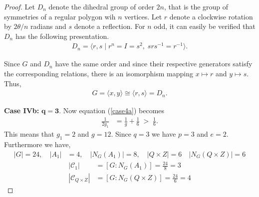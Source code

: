 \begin{proof}
Let $D_n$ denote the dihedral group of order $2n$, that is the group of symmetries of a regular polygon wih $n$ vertices. Let $r$ denote a clockwise rotation by $2\theta /n$ radians and $s$ denote a reflection. For $n$ odd, it can easily be verified that $D_n$ has the following presentation.
\begin{align*} D_n = \langle r, s \; | \; r^n = I = s^2, \; s r s^{-1} = r^{-1} \rangle.
\end{align*}

Since $G$ and $D_n$ have the same order and since their respective generators satisfy the corresponding relations, there is an isomorphism mapping $x \mapsto r$ and $y \mapsto s$. Thus,
\begin{align*} G = \langle x, y \rangle \cong \langle r, s \rangle = D_n.
\end{align*}

 \space \textbf{Case IVb:} $\pmb{q = 3}$. Now equation (\ref{case4a}) becomes
\begin{align*} \frac{1}{2g_1} &= \frac{1}{g} + \frac{1}{6} \; > \; \frac{1}{6}.
\end{align*}
This means that $g_1 = 2$ and $g = 12$. Since $q=3$ we have $p=3$ and $e=2$. Furthermore we have,
\begin{align*} |G| = 24, \quad |A_1| &= 4,  \quad |N_G(A_1)| = 8, \quad |Q \times Z| = 6 \quad |N_G(Q \times Z)| = 6
\end{align*}
\begin{align*} |\mathcal{C}_1| &= [G : N_G(A_1)] = \frac{24}{8} = 3
\\ |\mathcal{C}_{Q \times Z}| &= [G : N_G(Q \times Z)] = \frac{24}{6} = 4
\end{align*}





\end{proof}
